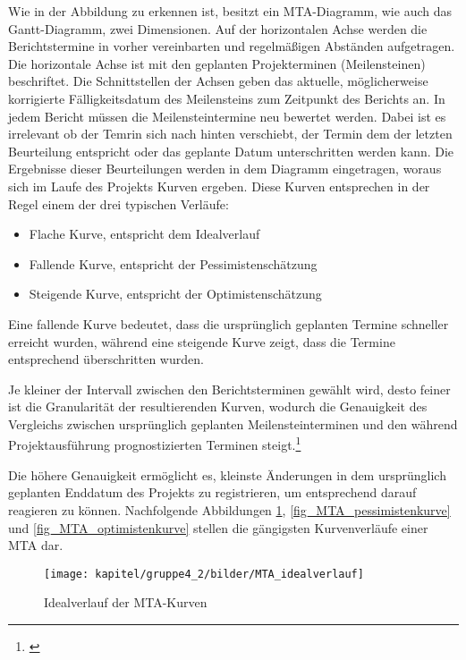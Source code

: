 Wie in der Abbildung zu erkennen ist, besitzt ein MTA-Diagramm, wie auch das Gantt-Diagramm, zwei Dimensionen. Auf der horizontalen Achse werden die Berichtstermine in vorher vereinbarten und regelmäßigen Abständen aufgetragen. Die horizontale Achse ist mit den geplanten Projekterminen (Meilensteinen) beschriftet. Die Schnittstellen der Achsen geben das aktuelle, möglicherweise korrigierte Fälligkeitsdatum des Meilensteins zum Zeitpunkt des Berichts an. In jedem Bericht müssen die Meilensteintermine neu bewertet werden. Dabei ist es irrelevant ob der Temrin sich nach hinten verschiebt, der Termin dem der letzten Beurteilung entspricht oder das geplante Datum unterschritten werden kann. Die Ergebnisse dieser Beurteilungen werden in dem Diagramm eingetragen, woraus sich im Laufe des Projekts Kurven ergeben. Diese Kurven entsprechen in der Regel einem der drei typischen Verläufe:

\begin{itemize}
	\item Flache Kurve, entspricht dem Idealverlauf
	\item Fallende Kurve, entspricht der Pessimistenschätzung
	\item Steigende Kurve, entspricht der Optimistenschätzung
\end{itemize}

Eine fallende Kurve bedeutet, dass die ursprünglich geplanten Termine schneller erreicht wurden, während eine steigende Kurve zeigt, dass die Termine entsprechend überschritten wurden.

Je kleiner der Intervall zwischen den Berichtsterminen gewählt wird, desto feiner ist die Granularität der resultierenden Kurven, wodurch die Genauigkeit des Vergleichs zwischen ursprünglich geplanten Meilensteinterminen und den während Projektausführung prognostizierten Terminen steigt.\footnote{\cite{gadatsch_masterkurs_2014}}

Die höhere Genauigkeit ermöglicht es, kleinste Änderungen in dem ursprünglich geplanten Enddatum des Projekts zu registrieren, um entsprechend darauf reagieren zu können. Nachfolgende Abbildungen \ref{fig_MTA_idealverlauf}, \ref{fig_MTA_pessimistenkurve} und \ref{fig_MTA_optimistenkurve} stellen die gängigsten Kurvenverläufe einer MTA dar.

\begin{figure}[h!]
	\centering
	\texttt{[image: kapitel/gruppe4\_2/bilder/MTA\_idealverlauf]}
	\caption{Idealverlauf der MTA-Kurven}
	\label{fig_MTA_idealverlauf}
\end{figure}

